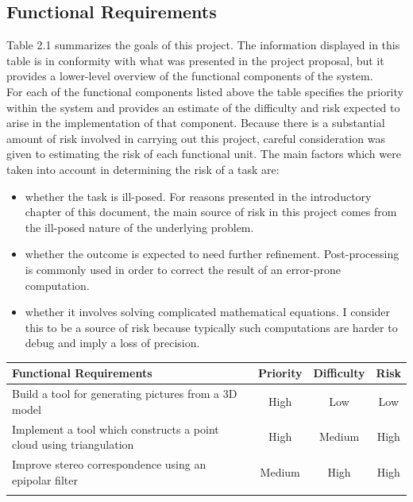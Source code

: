 \documentclass[12pt,a4paper,twoside,openright]{report}
\begin{document}
\subsection{Functional Requirements}
\begin{samepage}
Table 2.1 summarizes the goals of this project. The information displayed in this table is in conformity with what was presented in the project proposal, but it provides a lower-level overview of the functional components of the system.\\
For each of the functional components listed above the table specifies the priority within the system and provides an estimate of the difficulty and risk expected to arise in the implementation of that component. Because there is a substantial amount of risk involved in carrying out this project, careful consideration was given to estimating the risk of each functional unit. The main  factors which were taken into account in determining the risk of a task are:
\begin{itemize}
\item whether the task is ill-posed. For reasons presented in the introductory chapter of this document, the main source of risk in this project comes from the ill-posed nature of the underlying problem.
\item whether the outcome is expected to need further refinement. Post-processing is commonly used in order to correct the result of an error-prone computation.
\item whether it involves solving complicated mathematical equations. I consider this to be a source of risk because typically such computations are harder to debug and imply a loss of precision.
\end{itemize}     
\begin{center}
\begin{table}
\begin{tabularx}{\textwidth}{@{} Y c c c @{}} %
\toprule
\textbf{Functional Requirements} & \textbf{Priority} & \textbf{Difficulty} & \textbf{Risk}\\ \hline
\midrule
Build a tool for generating pictures from a 3D model                    &   High       &     Low      &   Low \\ \hline \addlinespace
Implement a tool which constructs a point cloud using triangulation   &   High       &     Medium      &   High \\ \hline \addlinespace
Improve stereo correspondence using an epipolar filter                  &   Medium       &     High      &   High \\ \hline \addlinespace

\end{tabularx}
\end{table}
\end{center}
\end{samepage}
\end{document}
